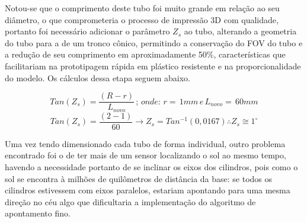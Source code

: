\documentclass[a4paper,12pt]{article}
\begin{document}
\newpage
Notou-se que o comprimento deste tubo foi muito grande em relação ao seu diâmetro, o que comprometeria o processo de impressão 3D com qualidade, portanto foi necessário adicionar o parâmetro $Z_{s}$ ao tubo, alterando a geometria do tubo para a de um tronco cônico, permitindo a conservação do FOV do tubo e a redução de seu comprimento em aproximadamente 50\%, características que facilitariam na prototipagem rápida em plástico resistente e na proporcionalidade do modelo. Os cálculos dessa etapa seguem abaixo.


$$Tan(Z_{s}) = \frac{(R-r)}{L_{novo}}  \, ; \,  onde: \, r= \,1mm \,e \, L_{novo}= \, 60mm $$
$$Tan(Z_{s}) = \frac{(2-1)}{60}  \longrightarrow   Z_{s} = Tan^{-1}(0,0167) \therefore Z_{s} \cong 1^{\circ} $$

Uma vez tendo dimensionado cada tubo de forma individual, outro problema encontrado foi o de ter mais de um sensor localizando o sol ao mesmo tempo, havendo a necessidade portanto de se inclinar os eixos dos cilindros, pois como o sol se encontra à milhões de quilômetros de distância da base: se todos os cilindros estivessem com eixos paralelos, estariam apontando para uma mesma direção no céu algo que dificultaria a implementação do algoritmo de apontamento fino. 
\end{document}
